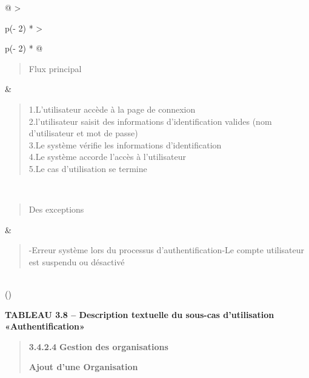 \documentclass[
]{article}
\begin{document}
\begin{longtable}[]{@{}
  >{\raggedright\arraybackslash}p{(\columnwidth - 2\tabcolsep) * }
  >{\raggedright\arraybackslash}p{(\columnwidth - 2\tabcolsep) * }@{}}
\begin{minipage}[t]{\linewidth}\raggedright
\begin{quote}
Flux principal
\end{quote}
\end{minipage} & \begin{minipage}[t]{\linewidth}\raggedright
\begin{quote}
1.L'utilisateur accède à la page de connexion\\
2.l'utilisateur saisit des informations d'identification valides (nom
d'utilisateur et mot de passe)\\
3.Le système vérifie les informations d'identification\\
4.Le système accorde l'accès à l'utilisateur\\
5.Le cas d'utilisation se termine
\end{quote}\strut
\end{minipage} \\
\begin{minipage}[t]{\linewidth}\raggedright
\begin{quote}
Des exceptions
\end{quote}
\end{minipage} & \begin{minipage}[t]{\linewidth}\raggedright
\begin{quote}
-Erreur système lors du processus d'authentification-Le compte
utilisateur est suspendu ou désactivé
\end{quote}
\end{minipage} \\
\bottomrule()
\end{longtable}

\textbf{TABLEAU 3.8 -- Description textuelle du sous-cas d'utilisation
«Authentification»}

\begin{quote}
\textbf{3.4.2.4} \textbf{Gestion des organisations}

\textbf{Ajout d'une Organisation}
\end{quote}
\end{document}
